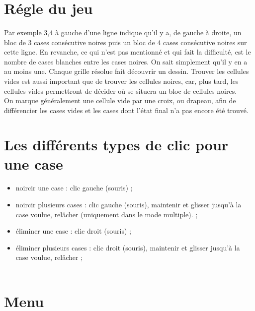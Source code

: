 \section{Régle du jeu}
        \paragraph*{}
        Par exemple 3,4 à gauche d’une ligne indique qu’il y a, de gauche à droite,
un bloc de 3 cases consécutive noires puis un bloc de 4 cases consécutive noires
sur cette ligne. En revanche, ce qui n’est pas mentionné et qui fait la difficulté,
est le nombre de cases blanches entre les cases noires. On sait simplement qu’il
y en a au moins une. Chaque grille résolue fait découvrir un dessin. Trouver les
cellules vides est aussi important que de trouver les cellules noires, car, plus tard,
les cellules vides permettront de décider où se situera un bloc de cellules noires.\\ 
On marque généralement une cellule vide par une croix, ou drapeau, afin de différencier les cases vides et les cases dont l'état final n'a pas encore été trouvé.


\section{Les différents types de clic pour une case}
        \paragraph*{}
        \begin{itemize}
                \item noircir une case : clic gauche (souris) ;
                \item noircir plusieurs cases : clic gauche (souris), maintenir et glisser jusqu’à la case voulue, relâcher (uniquement dans le mode multiple). ;
                \item éliminer une case : clic droit (souris) ;
                \item éliminer plusieurs cases : clic droit (souris), maintenir et glisser jusqu’à la case voulue, relâcher ; \\ \\             
        \end{itemize}





\section{Menu}
